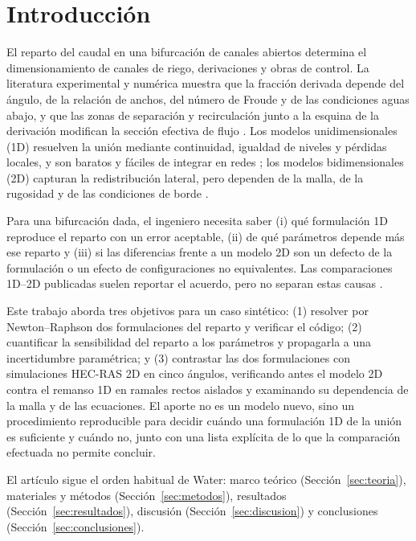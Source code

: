 \section{Introducción}
El reparto del caudal en una bifurcación de canales abiertos determina el dimensionamiento de canales de riego, derivaciones y obras de control. La literatura experimental y numérica muestra que la fracción derivada depende del ángulo, de la relación de anchos, del número de Froude y de las condiciones aguas abajo, y que las zonas de separación y recirculación junto a la esquina de la derivación modifican la sección efectiva de flujo \citep{ramamurthy1988,ramamurthy1990,hsu2002,momplot2017,ibrahim2022,gumgum2026}. Los modelos unidimensionales (1D) resuelven la unión mediante continuidad, igualdad de niveles y pérdidas locales, y son baratos y fáciles de integrar en redes \citep{chaudhry2008,chow1959}; los modelos bidimensionales (2D) capturan la redistribución lateral, pero dependen de la malla, de la rugosidad y de las condiciones de borde \citep{ghostine2012,ramamurthy2007}.

Para una bifurcación dada, el ingeniero necesita saber (i) qué formulación 1D reproduce el reparto con un error aceptable, (ii) de qué parámetros depende más ese reparto y (iii) si las diferencias frente a un modelo 2D son un defecto de la formulación o un efecto de configuraciones no equivalentes. Las comparaciones 1D--2D publicadas suelen reportar el acuerdo, pero no separan estas causas \citep{ghostine2012,gumgum2025}.

Este trabajo aborda tres objetivos para un caso sintético: (1) resolver por Newton--Raphson dos formulaciones del reparto y verificar el código; (2) cuantificar la sensibilidad del reparto a los parámetros y propagarla a una incertidumbre paramétrica; y (3) contrastar las dos formulaciones con simulaciones HEC-RAS 2D en cinco ángulos, verificando antes el modelo 2D contra el remanso 1D en ramales rectos aislados y examinando su dependencia de la malla y de las ecuaciones. El aporte no es un modelo nuevo, sino un procedimiento reproducible para decidir cuándo una formulación 1D de la unión es suficiente y cuándo no, junto con una lista explícita de lo que la comparación efectuada no permite concluir.

El artículo sigue el orden habitual de Water: marco teórico (Sección~\ref{sec:teoria}), materiales y métodos (Sección~\ref{sec:metodos}), resultados (Sección~\ref{sec:resultados}), discusión (Sección~\ref{sec:discusion}) y conclusiones (Sección~\ref{sec:conclusiones}).
